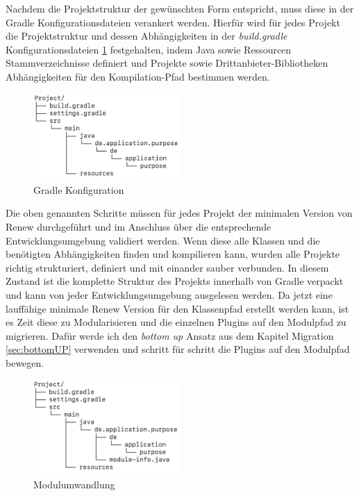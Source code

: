 	Nachdem die Projektstruktur der gewünschten Form entspricht, muss diese in der Gradle Konfigurationsdateien verankert werden. Hierfür wird für jedes Projekt die Projektstruktur und dessen Abhängigkeiten in der \textit{build.gradle} Konfigurationsdateien \ref{fig:gradle_project} festgehalten, indem Java sowie Ressourcen Stammverzeichnisse definiert und Projekte sowie Drittanbieter-Bibliotheken Abhängigkeiten für den Kompilation-Pfad bestimmen werden. \bigbreak

	\begin{figure}[h!]
	  \centering
	  \includegraphics[width=0.5\textwidth]{material/images/gradle_project.png}
	  \caption{Gradle Konfiguration}
	  \label{fig:gradle_project}
	\end{figure}

 	Die oben genannten Schritte müssen für jedes Projekt der minimalen Version von Renew durchgeführt und im Anschluss über die entsprechende Entwicklungsumgebung  validiert werden. Wenn diese alle Klassen und die benötigten Abhängigkeiten finden und kompilieren kann, wurden alle Projekte richtig strukturiert, definiert und mit einander sauber verbunden. In diesem Zustand ist die komplette Struktur des Projekts innerhalb von Gradle verpackt und kann von jeder Entwicklungsumgebung ausgelesen werden. \newline
	Da jetzt eine lauffähige minimale Renew Version für den Klassenpfad erstellt werden kann, ist es Zeit diese zu Modularisieren und die einzelnen Plugins auf den Modulpfad zu migrieren. Dafür werde ich den \textit{bottom up} Ansatz aus dem Kapitel Migration \ref{sec:bottomUP} verwenden und schritt für schritt die Plugins auf den Modulpfad bewegen. 

	\begin{figure}[h!]
	  \centering
	  \includegraphics[width=0.5\textwidth]{material/images/module_project.png}
	  \caption{Modulumwandlung}
	  \label{fig:module_project}
	\end{figure}

